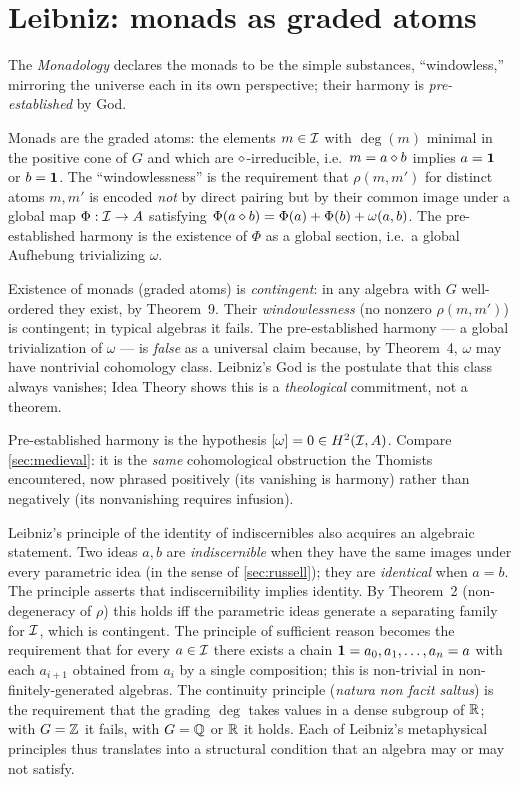 \section{Leibniz: monads as graded atoms}\label{sec:leibniz}

 The \emph{Monadology} \cite{Leibniz1714}
declares the monads to be the simple substances, ``windowless,''
mirroring the universe each in its own perspective; their harmony is
\emph{pre-established} by God.

\formalclaim Monads are the graded atoms: the elements $m\in\mathcal{I}$ with
$\deg(m)$ minimal in the positive cone of $G$ and which are
$\mathbin{\diamond}$-irreducible, i.e.\ $m=a\mathbin{\diamond} b$ implies $a=\mathbf{1}$ or
$b=\mathbf{1}$. The ``windowlessness'' is the requirement that
$\rho(m, m')$ for distinct atoms $m,m'$ is encoded \emph{not} by direct
pairing but by their common image under a global map $\Phi:\mathcal{I}\to A$
satisfying $\Phi(a\mathbin{\diamond} b) = \Phi(a)+\Phi(b)+\omega(a,b)$. The
pre-established harmony is the existence of $\Phi$ as a global section,
i.e.\ a global Aufhebung trivializing $\omega$.

\formalstatus Existence of monads (graded atoms) is \emph{contingent}:
in any algebra with $G$ well-ordered they exist, by Theorem~9. Their
\emph{windowlessness} (no nonzero $\rho(m,m')$) is contingent; in
typical algebras it fails. The pre-established harmony --- a global
trivialization of $\omega$ --- is \emph{false} as a universal claim
because, by Theorem~4, $\omega$ may have nontrivial cohomology class.
Leibniz's God is the postulate that this class always vanishes; Idea
Theory shows this is a \emph{theological} commitment, not a theorem.

\litcomment Pre-established harmony is the hypothesis $[\omega]=0\in
H^2(\mathcal{I}, A)$. Compare \cref{sec:medieval}: it is the \emph{same}
cohomological obstruction the Thomists encountered, now phrased
positively (its vanishing is harmony) rather than negatively (its
nonvanishing requires infusion).

Leibniz's principle of the identity of indiscernibles also acquires
an algebraic statement. Two ideas $a, b$ are \emph{indiscernible} when
they have the same images under every parametric idea (in the sense of
\cref{sec:russell}); they are \emph{identical} when $a = b$. The
principle asserts that indiscernibility implies identity. By Theorem~2
(non-degeneracy of $\rho$) this holds iff the parametric ideas
generate a separating family for $\mathcal{I}$, which is contingent. The
principle of sufficient reason becomes the requirement that for every
$a\in\mathcal{I}$ there exists a chain $\mathbf{1} = a_0, a_1, \dots, a_n = a$
with each $a_{i+1}$ obtained from $a_i$ by a single composition; this
is non-trivial in non-finitely-generated algebras. The continuity
principle (\emph{natura non facit saltus}) is the requirement that the
grading $\deg$ takes values in a dense subgroup of $\mathbb{R}$; with $G =
\mathbb{Z}$ it fails, with $G = \mathbb{Q}$ or $\mathbb{R}$ it holds. Each of Leibniz's
metaphysical principles thus translates into a structural condition
that an algebra may or may not satisfy.

